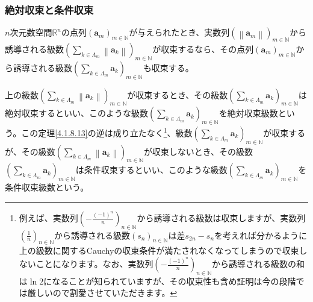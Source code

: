 \documentclass[dvipdfmx]{jsarticle}
\begin{document}
\subsubsection{絶対収束と条件収束}%
\begin{thm}\label{4.1.8.13}
$n$次元数空間$\mathbb{R}^{n}$の点列$\left( \mathbf{a}_{m} \right)_{m \in \mathbb{N}}$が与えられたとき、実数列$\left( \left\| \mathbf{a}_{m} \right\| \right)_{m \in \mathbb{N}}$から誘導される級数$\left( \sum_{k \in \varLambda_{m}} \left\| \mathbf{a}_{k} \right\| \right)_{m \in \mathbb{N}}$が収束するなら、その点列$\left( \mathbf{a}_{m} \right)_{m \in \mathbb{N}}$から誘導される級数$\left( \sum_{k \in \varLambda_{m}} \mathbf{a}_{k} \right)_{m \in \mathbb{N}}$も収束する。
\end{thm}
\begin{dfn}
上の級数$\left( \sum_{k \in \varLambda_{m}} \left\| \mathbf{a}_{k} \right\| \right)_{m \in \mathbb{N}}$が収束するとき、その級数$\left( \sum_{k \in \varLambda_{m}} \mathbf{a}_{k} \right)_{m \in \mathbb{N}}$は絶対収束するといい、このような級数$\left( \sum_{k \in \varLambda_{m}} \mathbf{a}_{k} \right)_{m \in \mathbb{N}}$を絶対収束級数という。この定理\ref{4.1.8.13}の逆は成り立たなく\footnote{例えば、実数列$\left( -\frac{\left(-1\right)^{n}}{n} \right)_{n\in \mathbb{N}}$から誘導される級数は収束しますが、実数列$\left( \frac{1}{n} \right)_{n\in \mathbb{N}}$から誘導される級数$\left( s_n \right)_{n\in \mathbb{N}}$は差$s_{2n}-s_n$を考えれば分かるように上の級数に関するCauchyの収束条件が満たされなくなってしまうので収束しないことになります。なお、実数列$\left( -\frac{\left(-1\right)^{n}}{n} \right)_{n\in \mathbb{N}}$から誘導される級数の和は$\ln 2$になることが知られていますが、その収束性も含め証明は今の段階では厳しいので割愛させていただきます。}、級数$\left( \sum_{k \in \varLambda_{m}} \mathbf{a}_{k} \right)_{m \in \mathbb{N}}$が収束するが、その級数$\left( \sum_{k \in \varLambda_{m}} \left\| \mathbf{a}_{k} \right\| \right)_{m \in \mathbb{N}}$が収束しないとき、その級数$\left( \sum_{k \in \varLambda_{m}} \mathbf{a}_{k} \right)_{m \in \mathbb{N}}$は条件収束するといい、このような級数$\left( \sum_{k \in \varLambda_{m}} \mathbf{a}_{k} \right)_{m \in \mathbb{N}}$を条件収束級数という。
\end{dfn}
\end{document}
